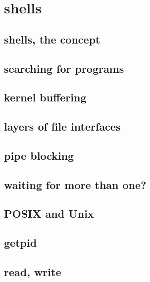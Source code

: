 \section{shells}

\subsection{shells, the concept}



\subsection{searching for programs}


\subsection{kernel buffering}



\subsection{layers of file interfaces}




\subsection{pipe blocking}

\subsection{waiting for more than one?}




\subsection{POSIX and Unix}



\subsection{getpid}



\subsection{read, write}

